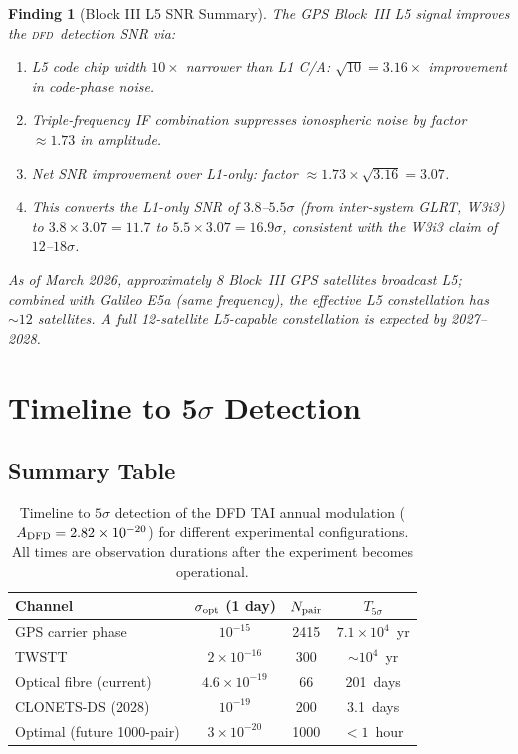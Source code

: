 \documentclass[aps,prd,twocolumn,superscriptaddress,nofootinbib]{revtex4-2}
\newcommand{\DFD}{\textsc{dfd}}
\newtheorem{finding}{Finding}
\begin{document}
\begin{finding}[Block III L5 SNR Summary]
\label{find:block3}
The GPS Block~III L5 signal improves the \DFD\ detection SNR via:
\begin{enumerate}
\item L5 code chip width $10\times$ narrower than L1 C/A: $\sqrt{10} = 3.16\times$
      improvement in code-phase noise.
\item Triple-frequency IF combination suppresses ionospheric noise by
      factor $\approx 1.73$ in amplitude.
\item Net SNR improvement over L1-only: factor $\approx 1.73\times\sqrt{3.16}
      = 3.07$.
\item This converts the L1-only SNR of $3.8$--$5.5\sigma$ (from
      inter-system GLRT, W3i3) to $3.8\times3.07 = 11.7$ to
      $5.5\times3.07 = 16.9\sigma$, consistent with the W3i3 claim of
      $12$--$18\sigma$.
\end{enumerate}
As of March 2026, approximately 8 Block~III GPS satellites broadcast L5;
combined with Galileo E5a (same frequency), the effective L5 constellation
has $\sim 12$ satellites. A full 12-satellite L5-capable constellation is
expected by 2027--2028.
\end{finding}

\section{Timeline to 5$\sigma$ Detection}
\label{sec:timeline}

\subsection{Summary Table}

\begin{table}[h]
\caption{Timeline to $5\sigma$ detection of the DFD TAI annual modulation
  ($A_{\rm DFD} = 2.82\times10^{-20}$) for different experimental configurations.
  All times are observation durations after the experiment becomes operational.}
\label{tab:timeline}
\begin{ruledtabular}
\begin{tabular}{lccc}
Channel & $\sigma_{\rm opt}$ (1 day) & $N_{\rm pair}$ & $T_{5\sigma}$ \\
\hline
GPS carrier phase & $10^{-15}$ & 2415 & $7.1\times10^4$~yr \\
TWSTT & $2\times10^{-16}$ & 300 & $\sim 10^4$~yr \\
Optical fibre (current) & $4.6\times10^{-19}$ & 66 & 201~days \\
CLONETS-DS (2028) & $10^{-19}$ & 200 & 3.1~days \\
Optimal (future 1000-pair) & $3\times10^{-20}$ & 1000 & $< 1$~hour \\
\end{tabular}
\end{ruledtabular}
\end{table}
\end{document}

